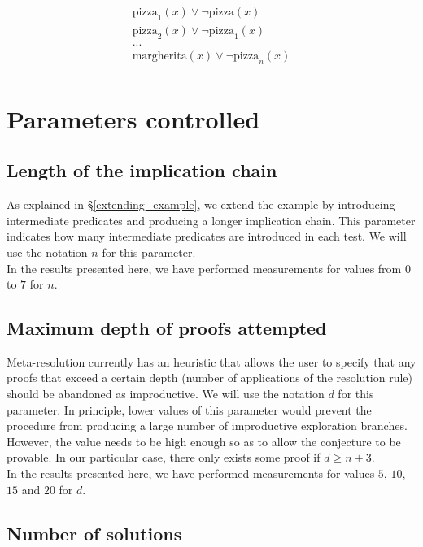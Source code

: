 \documentclass[12pt,a4paper]{article}
\begin{document}
\begin{equation}
\begin{array}{l}
\text{pizza}_1(x) \lor \neg \text{pizza}(x)\\
\text{pizza}_2(x) \lor \neg \text{pizza}_1(x)\\
...\\
\text{margherita}(x) \lor \neg \text{pizza}_n(x)\\
\end{array}
\end{equation}

\section{Parameters controlled}

\subsection{Length of the implication chain}

As explained in \S \ref{extending_example}, we extend the example by introducing intermediate predicates and producing a longer implication chain. This parameter indicates how many intermediate predicates are introduced in each test. We will use the notation $n$ for this parameter.\\

In the results presented here, we have performed measurements for values from $0$ to $7$ for $n$.

\subsection{Maximum depth of proofs attempted}

Meta-resolution currently has an heuristic that allows the user to specify that  any proofs that exceed a certain depth (number of applications of the resolution rule) should be abandoned as improductive. We will use the notation $d$ for this parameter. In principle, lower values of this parameter would prevent the procedure from producing a large number of improductive exploration branches. However, the value needs to be high enough so as to allow the conjecture to be provable. In our particular case, there only exists some proof if $d \geq n+3$.\\

In the results presented here, we have performed measurements for values $5$, $10$, $15$ and $20$ for $d$.

\subsection{Number of solutions}
\label{number_solutions}
\end{document}
